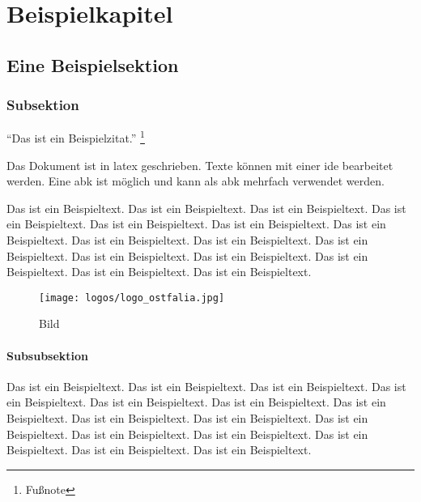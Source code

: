 \chapter{Beispielkapitel}
\label{ch:01-example}

\begin{comment}
Dies ist ein mehrzeiliger Kommentar.
Er wird nicht im Dokument angezeigt.
\end{comment}

\section{Eine Beispielsektion}
\label{sec:01-00-example}

\subsection{Subsektion}
\label{subsec:01-00-00-subsection}

\enquote{Das ist ein Beispielzitat.} \footnote{Fußnote}

Das Dokument ist in \Gls{latex} geschrieben.
Texte können mit einer \gls{ide} bearbeitet werden.
Eine \gls{abk} ist möglich und kann als \gls{abk} mehrfach verwendet werden.

Das ist ein Beispieltext. Das ist ein Beispieltext. Das ist ein Beispieltext. Das ist ein Beispieltext. Das ist ein Beispieltext. Das ist ein Beispieltext. Das ist ein Beispieltext. Das ist ein Beispieltext. Das ist ein Beispieltext. Das ist ein Beispieltext. Das ist ein Beispieltext. Das ist ein Beispieltext. Das ist ein Beispieltext. Das ist ein Beispieltext. Das ist ein Beispieltext.

\begin{figure}
	\centering
	\texttt{[image: logos/logo\_ostfalia.jpg]}
	\caption{Bild}
\end{figure}

\subsubsection{Subsubsektion}
\label{subsubsec:01-00-00-00-subsubsection}

Das ist ein Beispieltext. Das ist ein Beispieltext. Das ist ein Beispieltext. Das ist ein Beispieltext. Das ist ein Beispieltext. Das ist ein Beispieltext. Das ist ein Beispieltext. Das ist ein Beispieltext. Das ist ein Beispieltext. Das ist ein Beispieltext. Das ist ein Beispieltext. Das ist ein Beispieltext. Das ist ein Beispieltext. Das ist ein Beispieltext. Das ist ein Beispieltext.

